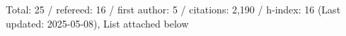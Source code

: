 Total: 25 / refereed: 16 / first author: 5 / citations: 2,190 / h-index: 16 (Last updated: 2025-05-08), List attached below